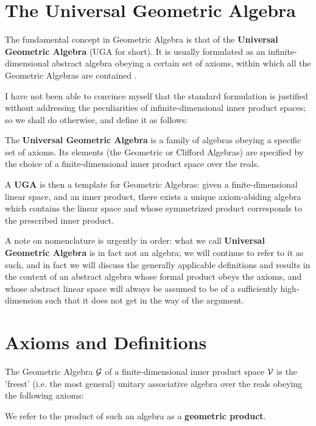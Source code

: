 \section{The Universal Geometric Algebra}\label{s:uga}

The fundamental concept in Geometric Algebra is that of the \textbf{Universal Geometric Algebra} (UGA for short). It is usually formulated as an infinite-dimensional abstract algebra obeying a certain set of axioms, within which all the Geometric Algebras are contained \cite{ga-origin}. 

I have not been able to convince myself that the standard formulation is justified without addressing the peculiarities of infinite-dimensional inner product spaces; so we shall do otherwise, and define it as follows:
\begin{definition}
	The \textbf{Universal Geometric Algebra} is a family of algebras obeying a specific set of axioms. Its elements (the Geometric or Clifford Algebras) are specified by the choice of a finite-dimensional inner product space over the reals.
\end{definition}

A \textbf{UGA} is then a template for Geometric Algebras: given a finite-dimensional linear space, and an inner product, there exists a unique axiom-abiding algebra which contains the linear space and whose symmetrized product corresponds to the prescribed inner product.

A note on nomenclature is urgently in order: what we call \textbf{Universal Geometric Algebra} is in fact not an algebra; we will continue to refer to it as such, and in fact we will discuss the generally applicable definitions and results in the context of an abstract algebra whose formal product obeys the axioms, and whose abstract linear space will always be assumed to be of a sufficiently high-dimension such that it does not get in the way of the argument.

\newpage

\section{Axioms and Definitions}\label{s:axioms-definitions}

The Geometric Algebra $\mathcal{G}$ of a finite-dimensional inner product space $\mathcal{V}$ is the 'freest' (i.e. the most general) unitary associative algebra over the reals obeying the following axioms:

We refer to the product of such an algebra as a \textbf{geometric product}.

